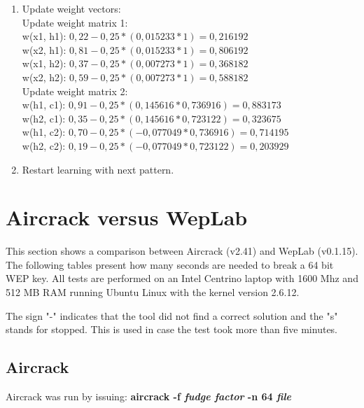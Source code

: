 \begin{appendix}
\begin{enumerate}
	\item Update weight vectors: \ \\

	Update weight matrix 1: \\

	w(x1, h1): $0,22 - 0,25 * (0,015233 * 1) = 0,216192$ \\
	w(x2, h1): $0,81 - 0,25 * (0,015233 * 1) = 0,806192$ \\
	w(x1, h2): $0,37 - 0,25 * (0,007273 * 1) = 0,368182$ \\
	w(x2, h2): $0,59 - 0,25 * (0,007273 * 1) = 0,588182$ \\

	Update weight matrix 2: \\

	w(h1, c1): $0,91 - 0,25 * (0,145616 * 0,736916) = 0,883173$ \\
	w(h2, c1): $0,35 - 0,25 * (0,145616 * 0,723122) = 0,323675$ \\
	w(h1, c2): $0,70 - 0,25 * (-0,077049 * 0,736916) = 0,714195$ \\
	w(h2, c2): $0,19 - 0,25 * (-0,077049 * 0,723122) = 0,203929$ \\

	\item Restart learning with next pattern.

\end{enumerate}

\chapter{Aircrack versus WepLab}
\label{sec:aircrack_weplab}

This section shows a comparison between Aircrack (v2.41) and WepLab (v0.1.15). The following tables present how many seconds are needed to break a 64 bit WEP key. All tests are performed on an Intel Centrino laptop with 1600 Mhz and 512 MB RAM running Ubuntu Linux with the kernel version 2.6.12.

The sign "-" indicates that the tool did not find a correct solution and the "s" stands for stopped. This is used in case the test took more than five minutes.

\section{Aircrack}

Aircrack was run by issuing: {\bf aircrack -f {\em fudge factor} -n 64 {\em file}}


\end{appendix}
